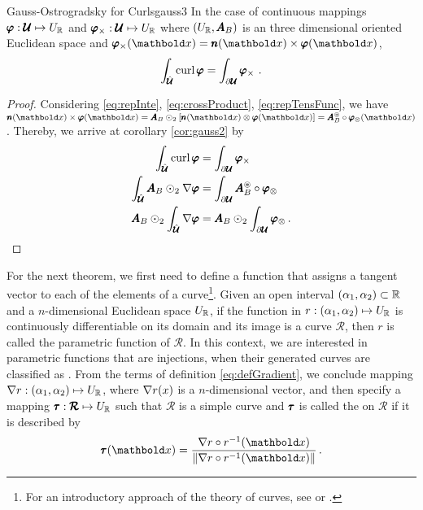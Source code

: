 \begin{mcoro}{Gauss-Ostrogradsky for Curls}{gauss3}
In the case of continuous mappings $\pmb{\varphi} : \pmb{\mathcal{U}} \mapsto U_{\mathbb{R}}$ and $\pmb{\varphi}_\times : \pmb{\mathcal{U}} \mapsto U_{\mathbb{R}}$ where $(U_{\mathbb{R}},\pmb{A}_B)$ is an three dimensional oriented Euclidean space and $\fua{\vtf{\varphi}_\times}{\vto{x}}=\fua{\vtf{n}}{\vto{x}}\times\fua{\vtf{\varphi}}{\vto{x}}$,
\begin{equation*}
\int_{\hat{\pmb{\mathcal{U}}}}\operatorname{curl}{\pmb{\varphi}} = \int_{\partial{\pmb{\mathcal{U}}}}\pmb{\varphi}_\times\,\,.
\end{equation*}
\end{mcoro}
{\footnotesize
\begin{proof}
Considering \eqref{eq:repInte}, \eqref{eq:crossProduct}, \eqref{eq:repTensFunc}, we have $\fua{\vtf{n}}{\vto{x}}\times\fua{\vtf{\varphi}}{\vto{x}}=\tnr{A}_B\odot_2[\fua{\vtf{n}}{\vto{x}}\otimes\fua{\vtf{\varphi}}{\vto{x}}]=\fua{\frt{A}_B\circ\vtf{\varphi}_\otimes}{\vto{x}}$. Thereby, we arrive at corollary \ref{cor:gauss2} by
\begin{align*}
\int_{\hat{\pmb{\mathcal{U}}}}\operatorname{curl}{\pmb{\varphi}} & = \int_{\partial{\pmb{\mathcal{U}}}}\pmb{\varphi}_\times\\
\int_{\hat{\pmb{\mathcal{U}}}}\pmb{A}_B\odot_2\nabla{\pmb{\varphi}} & = \int_{\partial{\pmb{\mathcal{U}}}}\pmb{{A}}^\circledast_B\circ\pmb{\varphi}_\otimes\\
\pmb{A}_B\odot_2\int_{\hat{\pmb{\mathcal{U}}}}\nabla{\pmb{\varphi}} & = \pmb{A}_B\odot_2\int_{\partial{\pmb{\mathcal{U}}}}\pmb{\varphi}_\otimes\,.
\end{align*}
\end{proof}
}



For the next theorem, we first need to define a function that assigns a tangent vector to each of the elements of a curve\footnote{For an introductory approach of the theory of curves, see \cite{docarmo_2016} or \cite{kreyszig_1991_1}.}. Given an open interval $(\alpha_1,\alpha_2)\subset\mathbb{R}$ and a $n$-dimensional Euclidean space $U_{\mathbb{R}}$, if the function in $r : (\alpha_1,\alpha_2) \mapsto U_{\mathbb{R}}$ is continuously differentiable on its domain and its image is a curve $\pmb{\mathcal{R}}$, then $r$ is called the parametric function of $\pmb{\mathcal{R}}$. In this context, we are interested in parametric functions that are injections, when their generated curves are classified as . From the terms of definition \eqref{eq:defGradient}, we conclude mapping $\nabla r : (\alpha_1,\alpha_2) \mapsto U_{\mathbb{R}}$, where $\nabla r(x)$ is a $n$-dimensional vector, and then specify a mapping $\pmb{\tau} : \pmb{\mathcal{R}} \mapsto U_{\mathbb{R}}$ such that $\pmb{\mathcal{R}}$ is a simple curve and $\pmb{\tau}$ is called the  on $\pmb{\mathcal{R}}$ if it is described by
\begin{equation}
\fua{\vtf{\tau}}{\vto{x}} = \dfrac{\fua{\nabla r\circ r^{-1}}{\vto{x}}}{\|\fua{\nabla r\circ r^{-1}}{\vto{x}}\|}\,.
\end{equation}

